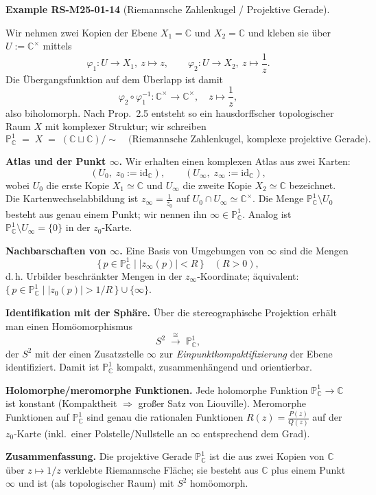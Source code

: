 \documentclass[10pt, letterpaper]{article}
\newcommand{\C}{\mathbb{C}}
\newcommand{\CustomHeading}[3]{%
  \par\medskip\noindent%
  \textbf{#1 #2} \textnormal{(#3)}.\enskip%
}
\newenvironment{EXA}[2]{\begin{unitbox}\CustomHeading{Example}{#1}{#2}}{\end{unitbox}}
\begin{document}
\begin{EXA}{RS-M25-01-14}{Riemannsche Zahlenkugel / Projektive Gerade}
Wir nehmen zwei Kopien der Ebene $X_1=\C$ und $X_2=\C$ und kleben sie über
$U:=\C^\times$ mittels
\[
\varphi_1:U\to X_1,\ z\mapsto z,
\qquad
\varphi_2:U\to X_2,\ z\mapsto \frac{1}{z}.
\]
Die Übergangsfunktion auf dem Überlapp ist damit
\[
\varphi_2\circ\varphi_1^{-1}: \C^\times\longrightarrow \C^\times,\quad
z\longmapsto \frac{1}{z},
\]
also biholomorph. Nach Prop.~2.5 entsteht so ein hausdorffscher
topologischer Raum $X$ mit komplexer Struktur; wir schreiben
\[
\mathbb{P}^1_\C \;=\; X \;=\; (\C \sqcup \C)/\!\sim
\quad\text{(Riemannsche Zahlenkugel, komplexe projektive Gerade).}
\]

\textbf{Atlas und der Punkt $\infty$.}
Wir erhalten einen komplexen Atlas aus zwei Karten:
\[
(U_0,\; z_0:=\mathrm{id}_\C),\qquad (U_\infty,\; z_\infty:=\mathrm{id}_\C),
\]
wobei $U_0$ die erste Kopie $X_1\simeq\C$ und $U_\infty$ die zweite Kopie $X_2\simeq\C$
bezeichnet. Die Kartenwechselabbildung ist $z_\infty=\frac{1}{z_0}$ auf
$U_0\cap U_\infty\simeq\C^\times$.
Die Menge $\mathbb{P}^1_\C\setminus U_0$ besteht aus genau einem Punkt; wir nennen ihn
$\infty\in\mathbb{P}^1_\C$. Analog ist $\mathbb{P}^1_\C\setminus U_\infty=\{0\}$ in der $z_0$-Karte.

\textbf{Nachbarschaften von $\infty$.}
Eine Basis von Umgebungen von $\infty$ sind die Mengen
\[
\{\,p\in\mathbb{P}^1_\C \mid |z_\infty(p)|<R\,\}\quad (R>0),
\]
d.\,h. Urbilder beschränkter Mengen in der $z_\infty$-Koordinate; äquivalent:
$\{\,p\in\mathbb{P}^1_\C \mid |z_0(p)|>1/R\,\}\cup\{\infty\}$.

\textbf{Identifikation mit der Sphäre.}
Über die stereographische Projektion erhält man einen Homöomorphismus
\[
S^2 \;\xrightarrow{\ \cong\ }\; \mathbb{P}^1_\C,
\]
der $S^2$ mit der einen Zusatzstelle $\infty$ zur \emph{Einpunktkompaktifizierung}
der Ebene identifiziert. Damit ist $\mathbb{P}^1_\C$ kompakt, zusammenhängend und orientierbar.

\textbf{Holomorphe/meromorphe Funktionen.}
Jede holomorphe Funktion $\mathbb{P}^1_\C\to\C$ ist konstant (Kompaktheit $\Rightarrow$
großer Satz von Liouville). Meromorphe Funktionen auf $\mathbb{P}^1_\C$ sind genau die
rationalen Funktionen $R(z)=\frac{P(z)}{Q(z)}$ auf der $z_0$-Karte (inkl.~einer
Polstelle/Nullstelle an $\infty$ entsprechend dem Grad).

\textbf{Zusammenfassung.}
Die projektive Gerade $\mathbb{P}^1_\C$ ist die aus zwei Kopien von $\C$ über
$z\mapsto 1/z$ verklebte Riemannsche Fläche; sie besteht aus $\C$ plus einem
Punkt $\infty$ und ist (als topologischer Raum) mit $S^2$ homöomorph.
\end{EXA}
\end{document}
